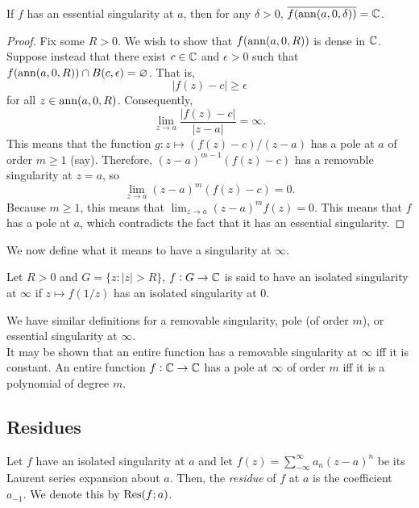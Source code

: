 	\begin{ftheo}
		If $f$ has an essential singularity at $a$, then for any $\delta > 0$, $\overline{f(\operatorname{ann}(a,0,\delta))} = \mathbb{C}$.
	\end{ftheo}
	\begin{proof}
		Fix some $R > 0$. We wish to show that $f(\operatorname{ann}(a,0,R))$ is dense in $\mathbb{C}$. Suppose instead that there exist $c \in \mathbb{C}$ and $\epsilon > 0$ such that $f(\operatorname{ann}(a,0,R)) \cap B(c,\epsilon) = \varnothing$. That is,
		\[ |f(z) - c| \ge \epsilon \]
		for all $z \in \operatorname{ann}(a,0,R)$. Consequently,
		\[ \lim_{z \to a} \frac{|f(z) - c|}{|z-a|} = \infty. \]
		This means that the function $g : z \mapsto (f(z) - c)/(z-a)$ has a pole at $a$ of order $m\ge1$ (say). Therefore, $(z-a)^{m-1} (f(z) - c)$ has a removable singularity at $z = a$, so
		\[ \lim_{z \to a} (z-a)^{m} (f(z) - c) = 0. \]
		Because $m \ge 1$, this means that $\lim_{z \to a} (z-a)^m f(z) = 0$. This means that $f$ has a pole at $a$, which contradicts the fact that it has an essential singularity.
	\end{proof}

	We now define what it means to have a singularity at $\infty$.

	\begin{definition}
		Let $R > 0$ and $G = \{z : |z| > R\}$, $f : G \to \mathbb{C}$ is said to have an isolated singularity at $\infty$ if $z \mapsto f(1/z)$ has an isolated singularity at $0$.
	\end{definition}
	We have similar definitions for a removable singularity, pole (of order $m$), or essential singularity at $\infty$.\\
	It may be shown that an entire function has a removable singularity at $\infty$ iff it is constant. An entire function $f : \mathbb{C} \to \mathbb{C}$ has a pole at $\infty$ of order $m$ iff it is a polynomial of degree $m$.\\

\subsection{Residues}

	\begin{fdef}
		Let $f$ have an isolated singularity at $a$ and let $f(z) = \sum_{-\infty}^{\infty} a_n (z-a)^n$ be its Laurent series expansion about $a$. Then, the \emph{residue} of $f$ at $a$ is the coefficient $a_{-1}$. We denote this by $\operatorname{Res}(f;a)$.
	\end{fdef}

